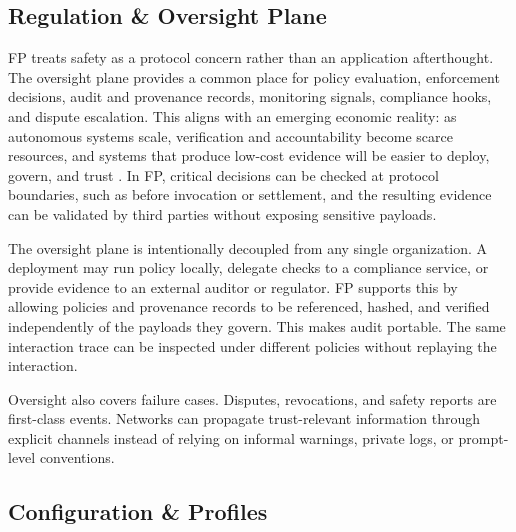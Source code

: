 \documentclass{foundationpaper}
\begin{document}

\subsection{Regulation \& Oversight Plane}
\label{subsec:oversight}

FP treats safety as a protocol concern rather than an application afterthought. The oversight plane provides a common place for policy evaluation, enforcement decisions, audit and provenance records, monitoring signals, compliance hooks, and dispute escalation. This aligns with an emerging economic reality: as autonomous systems scale, verification and accountability become scarce resources, and systems that produce low-cost evidence will be easier to deploy, govern, and trust \cite{agi_economics}. In FP, critical decisions can be checked at protocol boundaries, such as before invocation or settlement, and the resulting evidence can be validated by third parties without exposing sensitive payloads.

The oversight plane is intentionally decoupled from any single organization. A deployment may run policy locally, delegate checks to a compliance service, or provide evidence to an external auditor or regulator. FP supports this by allowing policies and provenance records to be referenced, hashed, and verified independently of the payloads they govern. This makes audit portable. The same interaction trace can be inspected under different policies without replaying the interaction.

Oversight also covers failure cases. Disputes, revocations, and safety reports are first-class events. Networks can propagate trust-relevant information through explicit channels instead of relying on informal warnings, private logs, or prompt-level conventions.


\subsection{Configuration \& Profiles}
\label{subsec:profiles}
\end{document}
